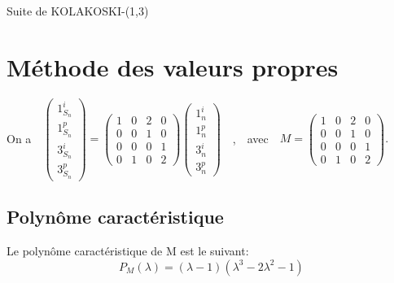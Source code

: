 \documentclass[12pt,a4paper,oneside]{book}
\begin{document}
\begin{titlepage}
\begin{chapter}{Suite de KOLAKOSKI-(1,3)}
\section{Méthode des valeurs propres}
On a  \,\ $\left( \begin{array}{c}
1_{S_n}^i \\ 
1_{S_n}^p \\ 
3_{S_n}^i \\ 
3_{S_n}^p
\end{array} \right) = 
\left( \begin{array}{cccc}
1 & 0 & 2 & 0 \\ 
0 & 0 & 1 & 0 \\ 
0 & 0 & 0 & 1 \\ 
0 & 1 & 0 & 2
\end{array} \right)
\left( \begin{array}{c}
1_n^i \\ 
1_n^p \\ 
3_n^i \\ 
3_n^p
\end{array} \right) $ \,\ , \,\
avec \,\ $M=\left( \begin{array}{cccc}
1 & 0 & 2 & 0 \\ 
0 & 0 & 1 & 0 \\ 
0 & 0 & 0 & 1 \\ 
0 & 1 & 0 & 2
\end{array} \right). $ \\
\subsection{Polyn\^ome caractéristique}
Le polyn\^ome caractéristique de M est le suivant: \[P_M(\lambda)=(\lambda -1)(\lambda^3-2\lambda^2-1) \]

\end{chapter}
\end{titlepage}
\end{document}
